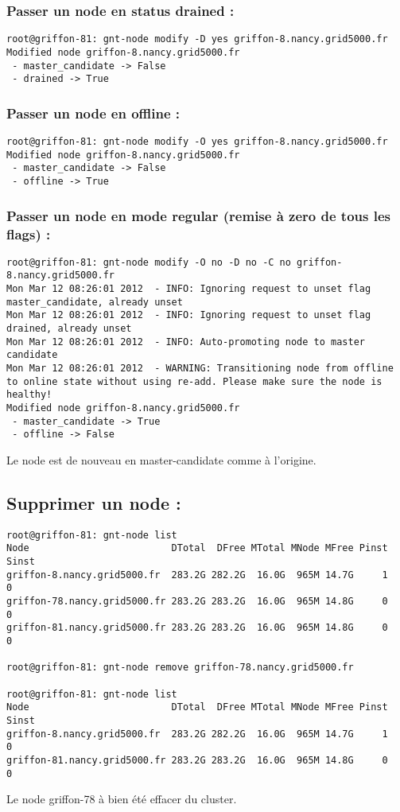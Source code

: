 \subsubsection{Passer un node en status drained :}
\begin{lstlisting}
root@griffon-81: gnt-node modify -D yes griffon-8.nancy.grid5000.fr
Modified node griffon-8.nancy.grid5000.fr
 - master_candidate -> False
 - drained -> True
\end{lstlisting}
\subsubsection{Passer un node en offline :}
\begin{lstlisting}
root@griffon-81: gnt-node modify -O yes griffon-8.nancy.grid5000.fr
Modified node griffon-8.nancy.grid5000.fr
 - master_candidate -> False
 - offline -> True
\end{lstlisting}
\subsubsection{Passer un node en mode regular (remise à zero de tous les flags) :}
\begin{lstlisting}
root@griffon-81: gnt-node modify -O no -D no -C no griffon-8.nancy.grid5000.fr
Mon Mar 12 08:26:01 2012  - INFO: Ignoring request to unset flag master_candidate, already unset
Mon Mar 12 08:26:01 2012  - INFO: Ignoring request to unset flag drained, already unset
Mon Mar 12 08:26:01 2012  - INFO: Auto-promoting node to master candidate
Mon Mar 12 08:26:01 2012  - WARNING: Transitioning node from offline to online state without using re-add. Please make sure the node is healthy!
Modified node griffon-8.nancy.grid5000.fr
 - master_candidate -> True
 - offline -> False
\end{lstlisting}
Le node est de nouveau en master-candidate comme à l'origine.

\subsection{Supprimer un node :}
\begin{lstlisting}
root@griffon-81: gnt-node list
Node                         DTotal  DFree MTotal MNode MFree Pinst Sinst
griffon-8.nancy.grid5000.fr  283.2G 282.2G  16.0G  965M 14.7G     1     0
griffon-78.nancy.grid5000.fr 283.2G 283.2G  16.0G  965M 14.8G     0     0
griffon-81.nancy.grid5000.fr 283.2G 283.2G  16.0G  965M 14.8G     0     0

root@griffon-81: gnt-node remove griffon-78.nancy.grid5000.fr

root@griffon-81: gnt-node list
Node                         DTotal  DFree MTotal MNode MFree Pinst Sinst
griffon-8.nancy.grid5000.fr  283.2G 282.2G  16.0G  965M 14.7G     1     0
griffon-81.nancy.grid5000.fr 283.2G 283.2G  16.0G  965M 14.8G     0     0
\end{lstlisting}
Le node griffon-78 à bien été effacer du cluster.

